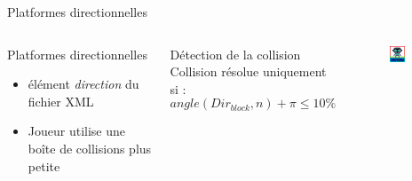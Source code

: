 \documentclass{beamer}
\begin{document}
{\begin{frame}{Platformes directionnelles}
    \begin{columns}
            \begin{block}{Platformes directionnelles}
                \begin{itemize}
                    \item[\bullet] élément \emph{direction} du fichier XML
                    \item[\bullet] Joueur utilise une boîte de collisions plus petite
                \end{itemize}
            \end{block}
            \begin{block}{Détection de la collision}
                Collision résolue uniquement si :
                \[angle(Dir_{block},n) + \pi \le 10\%\]
            \end{block}
            \begin{figure}
                \centering
                \includegraphics[width=0.5\textwidth]{DirectionnalHB}
            \end{figure}
    \end{columns}
\end{frame}

}
\end{document}
